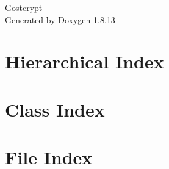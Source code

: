 \documentclass[twoside]{book}
\newcommand{\+}{\discretionary{\mbox{\scriptsize$\hookleftarrow$}}{}{}}
\newcommand{\clearemptydoublepage}{%
  \newpage{\pagestyle{empty}\cleardoublepage}%
}
\begin{document}
\hypersetup{pageanchor=false,
             bookmarksnumbered=true,
             pdfencoding=unicode
            }
\begin{titlepage}
\vspace*{7cm}
\begin{center}%
{\Large Gostcrypt }\\
\vspace*{1cm}
{\large Generated by Doxygen 1.8.13}\\
\end{center}
\end{titlepage}
\clearemptydoublepage
{}
\tableofcontents
\clearemptydoublepage
{}
\hypersetup{pageanchor=true}

\chapter{Hierarchical Index}

\chapter{Class Index}

\chapter{File Index}

\end{document}
